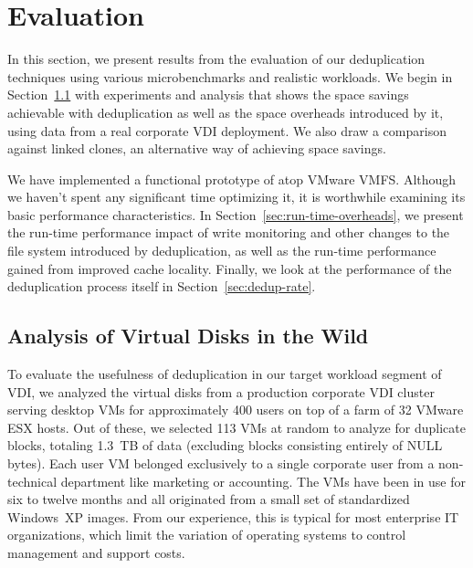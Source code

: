 


\long{}

\section{Evaluation}
\label{sec:evaluation}

In this section, we present results from the evaluation of our
deduplication techniques using various microbenchmarks and realistic
workloads.  We begin in Section~\ref{sec:vmware-vdi-analysis} with
experiments and analysis that shows the space savings achievable with
deduplication as well as the space overheads introduced by it, using
data from a real corporate VDI deployment. We also draw a comparison
against linked clones, an alternative way of achieving space savings.

We have implemented a functional prototype of \DeDe atop VMware
VMFS. Although we haven't spent any significant time optimizing it, it
is worthwhile examining its basic performance characteristics. In
Section~\ref{sec:run-time-overheads}, we present the run-time
performance impact of write monitoring and other changes to the file
system introduced by deduplication, as well as the run-time
performance gained from improved cache locality.  Finally,
we look at the performance of the deduplication process itself in
Section~\ref{sec:dedup-rate}.


\subsection{Analysis of Virtual Disks in the Wild}
\label{sec:vmware-vdi-analysis}

To evaluate the usefulness of deduplication in our target workload
segment of VDI, we analyzed the virtual disks from a production
corporate VDI cluster serving desktop VMs for approximately 400 users
on top of a farm of 32 VMware ESX hosts.  Out of these, we selected
113 VMs at random to analyze for duplicate blocks, totaling 1.3~TB of
data (excluding blocks consisting entirely of NULL bytes).  Each user
VM belonged exclusively to a single corporate user from a
non-technical department like marketing or accounting.  The VMs
have been in use for six to twelve months and all
originated from a small set of standardized Windows~XP images.  From
our experience, this is typical for most enterprise IT organizations,
which limit the variation of operating systems to control management
and support costs.
%
%

